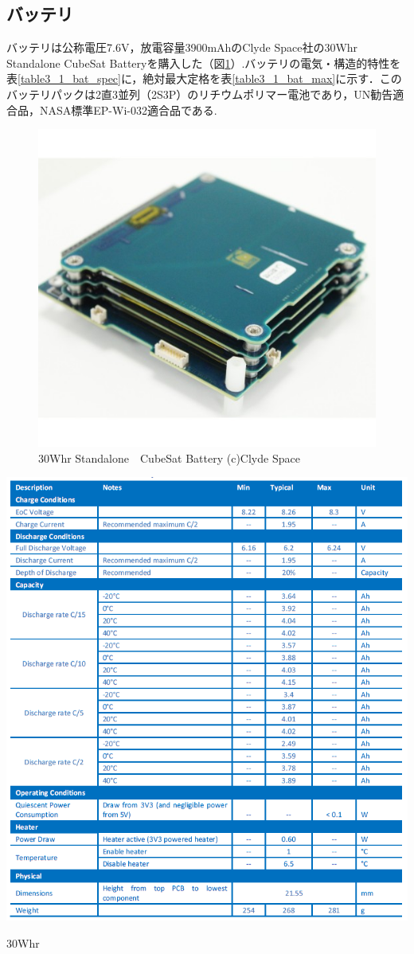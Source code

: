 \subsection{バッテリ}
バッテリは公称電圧7.6V，放電容量3900mAhのClyde Space社の30Whr　Standalone CubeSat Batteryを購入した（図\ref{fig3_1_bat}）.バッテリの電気・構造的特性を表\ref{table3_1_bat_spec}に，絶対最大定格を表\ref{table3_1_bat_max}に示す．このバッテリパックは2直3並列（2S3P）のリチウムポリマー電池であり，UN勧告適合品，NASA標準EP-Wi-032適合品である.

\begin{figure}[htbp]
	\begin{center}
		\includegraphics[width=0.5\linewidth]{./03/fig/battery.jpg}
		\caption{30Whr Standalone　CubeSat Battery (c)Clyde Space}
		\label{fig3_1_bat}
	\end{center}
\end{figure}

\begin{table}[htbp]
	\begin{center}
		\includegraphics[width=0.9\linewidth]{./03/fig/battery_spec.png}
		\caption{30Whr}
		\label{table3_1_bat_spec}
	\end{center}
\end{table}



